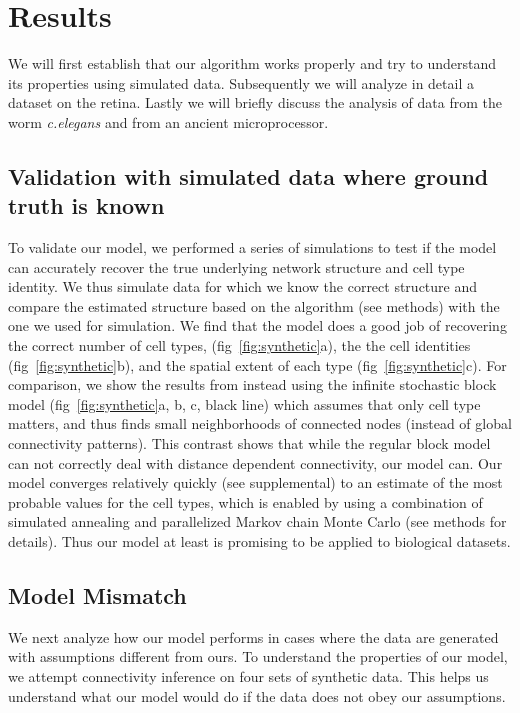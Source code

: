 \documentclass{article}
\begin{document}
\section*{Results}
We will first establish that our algorithm works properly and try to
understand its properties using simulated data. Subsequently we will
analyze in detail a dataset on the retina. Lastly we will briefly
discuss the analysis of data from the worm \textit{c.elegans} and from
an ancient microprocessor.


\subsection*{Validation with simulated data where ground truth is known}
To validate our model, we performed a series of simulations to test if
the model can accurately recover the true underlying network structure
and cell type identity.  We thus simulate data for which we know the
correct structure and compare the estimated structure based on the
algorithm (see methods) with the one we used for simulation. We find
that the model does a good job of recovering the correct number of
cell types, (fig~\ref{fig:synthetic}a), the the cell identities
(fig~\ref{fig:synthetic}b), and the spatial extent of each type
(fig~\ref{fig:synthetic}c).  For comparison, we show the results from
instead using the infinite stochastic block model
(fig~\ref{fig:synthetic}a, b, c, black line) which assumes that only
cell type matters, and thus finds small neighborhoods of connected
nodes (instead of global connectivity patterns). This contrast shows
that while the regular block model can not correctly deal with
distance dependent connectivity, our model can. Our model converges
relatively quickly (see supplemental) to an estimate of the most
probable values for the cell types, which is enabled by using a
combination of simulated annealing and parallelized Markov chain Monte
Carlo (see methods for details). Thus our model at least is promising
to be applied to biological datasets.



\subsection*{Model Mismatch}
We next analyze how our model performs in cases where the data are
generated with assumptions different from ours.  To understand the
properties of our model, we attempt connectivity inference on four
sets of synthetic data. This helps us understand what our model would
do if the data does not obey our assumptions.
\end{document}

